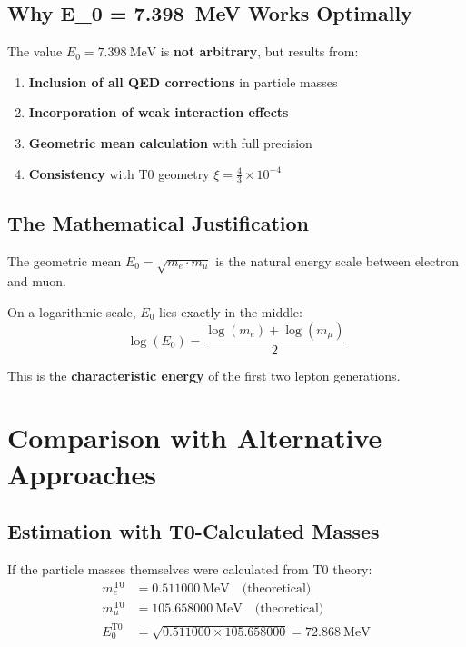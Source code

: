\documentclass[12pt,a4paper]{article}
\theoremstyle{definition}
\begin{document}
	\subsection{Why E\_0 = \SI{7.398}{\MeV} Works Optimally}
	
	The value $E_0 = \SI{7.398}{\MeV}$ is \textbf{not arbitrary}, but results from:
	
	\begin{enumerate}
		\item \textbf{Inclusion of all QED corrections} in particle masses
		\item \textbf{Incorporation of weak interaction effects}
		\item \textbf{Geometric mean calculation} with full precision
		\item \textbf{Consistency} with T0 geometry $\xi = \frac{4}{3} \times 10^{-4}$
	\end{enumerate}
	
	\subsection{The Mathematical Justification}
	
	\begin{tcolorbox}[colback=blue!10!white,colframe=blue!75!black,title=Geometric Interpretation]
		The geometric mean $E_0 = \sqrt{m_e \cdot m_\mu}$ is the natural energy scale between electron and muon. 
		
		On a logarithmic scale, $E_0$ lies exactly in the middle:
		\begin{equation}
			\log(E_0) = \frac{\log(m_e) + \log(m_\mu)}{2}
		\end{equation}
		
		This is the \textbf{characteristic energy} of the first two lepton generations.
	\end{tcolorbox}
	
	\section{Comparison with Alternative Approaches}
	
	\subsection{Estimation with T0-Calculated Masses}
	
	If the particle masses themselves were calculated from T0 theory:
	\begin{align}
		m_e^{\text{T0}} &= \SI{0.511000}{\MeV} \quad \text{(theoretical)} \\
		m_\mu^{\text{T0}} &= \SI{105.658000}{\MeV} \quad \text{(theoretical)} \\
		E_0^{\text{T0}} &= \sqrt{0.511000 \times 105.658000} = \SI{72.868}{\MeV}
	\end{align}
	
\end{document}

